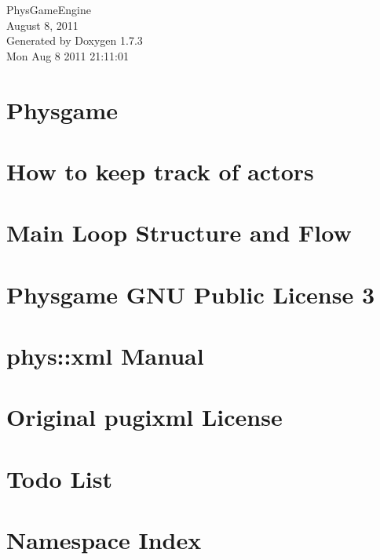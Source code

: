 \documentclass[a4paper]{article}
\begin{document}
\hypersetup{pageanchor=false}
\begin{titlepage}
\vspace*{7cm}
\begin{center}
{\Large PhysGameEngine \\[1ex]\large August 8, 2011 }\\
\vspace*{1cm}
{\large Generated by Doxygen 1.7.3}\\
\vspace*{0.5cm}
{\small Mon Aug 8 2011 21:11:01}\\
\end{center}
\end{titlepage}
\tableofcontents
{}
\hypersetup{pageanchor=true}
\section{Physgame}
\label{index}\hypertarget{index}{}
\section{How to keep track of actors}
\label{actorcontainer1}
\hypertarget{actorcontainer1}{}

\section{Main Loop Structure and Flow}
\label{mainloop1}
\hypertarget{mainloop1}{}

\section{Physgame GNU Public License 3}
\label{GPLLicense}
\hypertarget{GPLLicense}{}

\section{phys::xml Manual}
\label{XMLManual}
\hypertarget{XMLManual}{}

\section{Original pugixml License}
\label{OriginalpugixmlLicense}
\hypertarget{OriginalpugixmlLicense}{}

\section{Todo List}
\label{todo}
\hypertarget{todo}{}

\section{Namespace Index}

\end{document}
